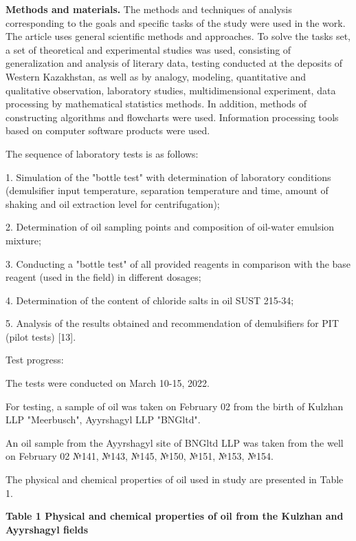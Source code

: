 {\bfseries Methods and materials.} The methods and techniques of analysis
corresponding to the goals and specific tasks of the study were used in
the work. The article uses general scientific methods and approaches. To
solve the tasks set, a set of theoretical and experimental studies was
used, consisting of generalization and analysis of literary data,
testing conducted at the deposits of Western Kazakhstan, as well as by
analogy, modeling, quantitative and qualitative observation, laboratory
studies, multidimensional experiment, data processing by mathematical
statistics methods. In addition, methods of constructing algorithms and
flowcharts were used. Information processing tools based on computer
software products were used.

The sequence of laboratory tests is as follows:

1. Simulation of the "bottle test" with determination of laboratory
conditions (demulsifier input temperature, separation temperature and
time, amount of shaking and oil extraction level for centrifugation);

2. Determination of oil sampling points and composition of oil-water
emulsion mixture;

3. Conducting a "bottle test" of all provided reagents in comparison
with the base reagent (used in the field) in different dosages;

4. Determination of the content of chloride salts in oil SUST 215-34;

5. Analysis of the results obtained and recommendation of demulsifiers
for PIT (pilot tests) {[}13{]}.

Test progress:

The tests were conducted on March 10-15, 2022.

For testing, a sample of oil was taken on February 02 from the birth of
Kulzhan LLP "Meerbusch", Ayyrshagyl LLP "BNGltd".

An oil sample from the Ayyrshagyl site of BNGltd LLP was taken from the
well on February 02 №141, №143, №145, №150, №151, №153, №154.

The physical and chemical properties of oil used in study are presented
in Table 1.

{\bfseries Table 1 Physical and chemical properties of oil from the Kulzhan
and Ayyrshagyl fields}

